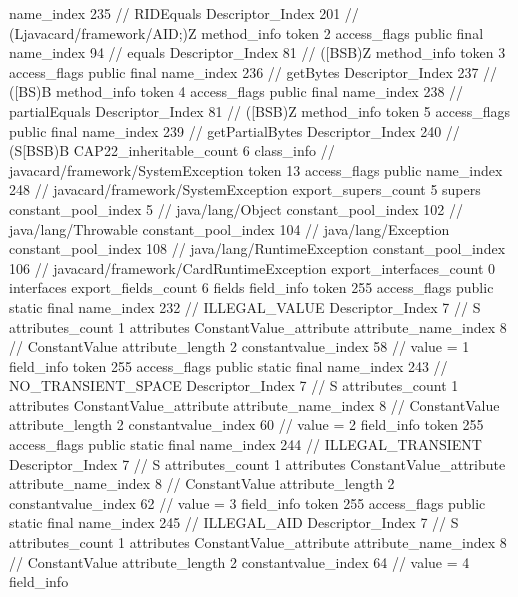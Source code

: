 {{{{{					name_index	235		// RIDEquals
					Descriptor_Index	201		// (Ljavacard/framework/AID;)Z
				}
				method_info {
					token	2
					access_flags	public final
					name_index	94		// equals
					Descriptor_Index	81		// ([BSB)Z
				}
				method_info {
					token	3
					access_flags	public final
					name_index	236		// getBytes
					Descriptor_Index	237		// ([BS)B
				}
				method_info {
					token	4
					access_flags	public final
					name_index	238		// partialEquals
					Descriptor_Index	81		// ([BSB)Z
				}
				method_info {
					token	5
					access_flags	public final
					name_index	239		// getPartialBytes
					Descriptor_Index	240		// (S[BSB)B
				}
			}
			CAP22_inheritable_count	6
		}
		class_info {		// javacard/framework/SystemException
			token	13
			access_flags	public
			name_index	248		// javacard/framework/SystemException
			export_supers_count	5
			supers {
				constant_pool_index	5		// java/lang/Object
				constant_pool_index	102		// java/lang/Throwable
				constant_pool_index	104		// java/lang/Exception
				constant_pool_index	108		// java/lang/RuntimeException
				constant_pool_index	106		// javacard/framework/CardRuntimeException
			}
			export_interfaces_count	0
			interfaces {
			}
			export_fields_count	6
			fields {
			field_info {
				token	255
				access_flags	public static final
				name_index	232		// ILLEGAL_VALUE
				Descriptor_Index	7		// S
				attributes_count	1
				attributes {
				ConstantValue_attribute {
					attribute_name_index	8		// ConstantValue
					attribute_length	2
					constantvalue_index	58		// value = 1
				}
				}
			}
			field_info {
				token	255
				access_flags	public static final
				name_index	243		// NO_TRANSIENT_SPACE
				Descriptor_Index	7		// S
				attributes_count	1
				attributes {
				ConstantValue_attribute {
					attribute_name_index	8		// ConstantValue
					attribute_length	2
					constantvalue_index	60		// value = 2
				}
				}
			}
			field_info {
				token	255
				access_flags	public static final
				name_index	244		// ILLEGAL_TRANSIENT
				Descriptor_Index	7		// S
				attributes_count	1
				attributes {
				ConstantValue_attribute {
					attribute_name_index	8		// ConstantValue
					attribute_length	2
					constantvalue_index	62		// value = 3
				}
				}
			}
			field_info {
				token	255
				access_flags	public static final
				name_index	245		// ILLEGAL_AID
				Descriptor_Index	7		// S
				attributes_count	1
				attributes {
				ConstantValue_attribute {
					attribute_name_index	8		// ConstantValue
					attribute_length	2
					constantvalue_index	64		// value = 4
				}
				}
			}
			field_info {
}}}}}
